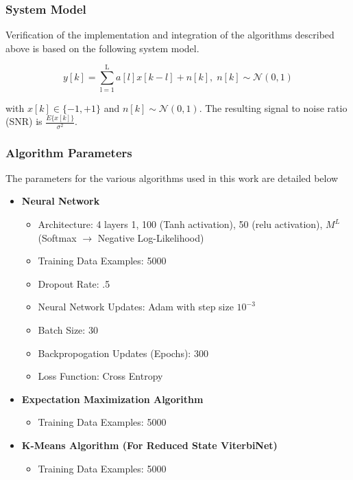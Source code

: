 \documentclass[12pt,a4paper]{article}
\begin{document}
\subsubsection{System Model}
Verification of the implementation and integration of the algorithms described above is based on the following system model.

%


\begin{equation}
y[k] = \sum_{\mathrm{l=1}}^{\mathrm{L}} a[l]x[k-l] + n[k], \; n[k]  \sim \mathcal{N}(0,1)
\end{equation}

with $x[k] \in \{ -1, +1\}$ and $n[k]  \sim \mathcal{N}(0,1)$.  
The resulting signal to noise ratio (SNR) is 
$\frac{E\{x[k]\}}{\sigma^2}$.


\subsubsection{Algorithm Parameters}
The parameters for the various algorithms used in this work are detailed below
\begin{itemize}
\item \textbf{Neural Network}
\begin{itemize}
\item Architecture: 4 layers {1, 100 (Tanh activation), 50 (relu activation), $M^L$ (Softmax $\rightarrow$ Negative Log-Likelihood)}
\item Training Data Examples: 5000
\item Dropout Rate: .5
\item Neural Network Updates: Adam with step size $10^{-3}$ \cite{kingma2014adam}
\item Batch Size: 30 
\item Backpropogation Updates (Epochs): 300
\item Loss Function: Cross Entropy
\end{itemize}
\item \textbf{Expectation Maximization Algorithm}
\begin{itemize}
\item Training Data Examples: 5000
\end{itemize}
\item \textbf{K-Means Algorithm (For Reduced State ViterbiNet)}
\begin{itemize}
\item Training Data Examples: 5000
\end{itemize}
\end{itemize}
\end{document}
